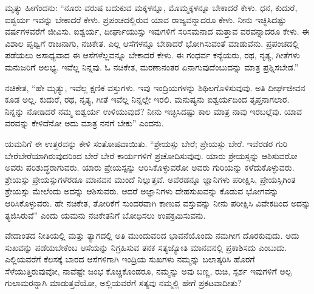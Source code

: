 \vskip 0.2cm 

ಮೃತ್ಯು ಹೀಗೆಂದನು: “ನೂರು ವರುಷ ಬದುಕುವ ಮಕ್ಕಳನ್ನೂ, ಮೊಮ್ಮಕ್ಕಳನ್ನೂ ಬೇಕಾದರೆ ಕೇಳು. ಧನ, ಕುದುರೆ, ಐಶ್ವರ್ಯ ಇವನ್ನು ಬೇಕಾದರೆ ಕೇಳು. ಪ್ರಪಂಚದಲ್ಲಿರುವ ಯಾವ ರಾಜ್ಯವನ್ನಾದರೂ ಕೇಳು. ನೀನು ಇಚ್ಛಿಸಿದಷ್ಟು ವರ್ಷಗಳವರೆಗೆ ಜೀವಿಸು. ಐಶ್ವರ್ಯ, ದೀರ್ಘಾಯುಸ್ಸು ಇವುಗಳಿಗೆ ಸರಿಸಮನಾದ ಮತ್ತಾವ ವರವನ್ನಾದರೂ ಕೇಳು. ಈ ವಿಶಾಲ ಪೃಥ್ವಿಗೆ ರಾಜನಾಗು, ನಚಿಕೇತ. ಎಲ್ಲ ಆಸೆಗಳನ್ನೂ ಬೇಕಾದರೆ ಭೋಗಿಸುವಂತೆ ಮಾಡುವೆನು. ಪ್ರಪಂಚದಲ್ಲಿ ಪಡೆಯಲು ಅಸಾಧ್ಯವಾದ ಈ ಆಸೆಗಳೆಲ್ಲವನ್ನೂ ಬೇಕಾದರೆ ಕೇಳು. ಈ ಗಂಧರ್ವ ಕನ್ಯೆಯರು, ರಥ, ನೃತ್ಯ, ಗೀತೆಗಳು ಮನುಜರಿಗೆ ಅಲಭ್ಯ. ಇವೆಲ್ಲ ನಿನ್ನವು. ಓ ನಚಿಕೇತ, ಮರಣಾನಂತರ ಏನಾಗುವುದೆಂಬುದನ್ನು ಮಾತ್ರ ಪ್ರಶ್ನಿಸಬೇಡ.”

\vskip 0.2cm 

ನಚಿಕೇತ, “ಹೇ ಮೃತ್ಯು, ಇವೆಲ್ಲ ಕ್ಷಣಿಕ ವಸ್ತುಗಳು. ಇವು ಇಂದ್ರಿಯಗಳನ್ನು ಶಿಥಿಲಗೊಳಿಸುವುವು. ಅತಿ ದೀರ್ಘಜೀವನ ಕೂಡ ಅಲ್ಲ. ಕುದುರೆ, ರಥ, ನೃತ್ಯ, ಗೀತೆ ಇವೆಲ್ಲ ನಿನ್ನಲ್ಲೇ ಇರಲಿ. ಮನುಷ್ಯನು ಐಶ್ವರ್ಯದಿಂದ ತೃಪ್ತನಾಗಲಾರ. ನಿನ್ನನ್ನು ನೋಡಿದರೆ ನಮ್ಮ ಐಶ್ವರ್ಯ ಉಳಿಯುವುದೆ? ನೀನು ಇಚ್ಛಿಸಿದಷ್ಟು ಕಾಲ ಮಾತ್ರ ನಾವು ಇರಬಲ್ಲೆವು. ಯಾವ ವರವನ್ನು ಕೇಳಿದೆನೋ ಅದು ಮಾತ್ರ ನನಗೆ ಬೇಕು” ಎಂದನು.

\vskip 0.2cm 

ಯಮನಿಗೆ ಈ ಉತ್ತರವನ್ನು ಕೇಳಿ ಸಂತೋಷವಾಯಿತು. “ಶ್ರೇಯಸ್ಸು ಬೇರೆ; ಪ್ರೇಯಸ್ಸು ಬೇರೆ. ಇವೆರಡರ ಗುರಿ ಬೇರೆಬೇರೆಯಾಗಿರುವುದರಿಂದ ಬೇರೆ ಬೇರೆ ಕಾರ್ಯಗಳಿಗೆ ಪ್ರಚೋದಿಸುವುವು. ಯಾರು ಶ್ರೇಯಸ್ಸನ್ನು ಆಶಿಸುವರೋ ಅವರು ಪರಿಶುದ್ಧರಾಗುವರು. ಯಾರು ಪ್ರೇಯಸ್ಸನ್ನು ಆರಿಸಿಕೊಳ್ಳುವರೋ ಅವರು ಗುರಿಯನ್ನು ಕಳೆದುಕೊಳ್ಳುವರು. ಶ್ರೇಯಸ್ಸು ಪ್ರೇಯಸ್ಸುಗಳೆರಡೂ ಮಾನವನ ಮುಂದೆ ನಿಲ್ಲುತ್ತವೆ. ಅವೆರಡನ್ನೂ ಜ್ಞಾನಿಗಳು ಪರೀಕ್ಷಿಸಿ, ಪ್ರೇಯಸ್ಸಿಗಿಂತ ಶ್ರೇಯಸ್ಸು ಮೇಲೆಂದು ಅದನ್ನು ಆಶಿಸುವರು. ಆದರೆ ಅಜ್ಞಾನಿಗಳು ದೇಹಸುಖವನ್ನು ಕೊಡುವ ಭೋಗವನ್ನು ಆರಿಸಿಕೊಳ್ಳುವರು. ಹೇ ನಚಿಕೇತ, ತೋರಿಕೆಗೆ ಸುಂದರವಾಗಿ ಕಾಣುವ ವಸ್ತುವನ್ನು ನೀನು ಪರೀಕ್ಷಿಸಿ ವಿವೇಕದಿಂದ ಅದನ್ನು ತ್ಯಜಿಸಿರುವೆ” ಎಂದು ಯಮನು ನಚಿಕೇತನಿಗೆ ಬೋಧಿಸಲು ಉಪಕ್ರಮಿಸುವನು.

\vskip 0.2cm 

ವೇದಾಂತದ ನೀತಿಯಲ್ಲಿ ಮತ್ತು ತ್ಯಾಗದಲ್ಲಿ ಅತಿ ಮುಂದುವರಿದ ಭಾವನೆಯೊಂದು ನಮಗೀಗ ದೊರಕುವುದು. ಅದು ಸುಖವನ್ನು ಪಡೆಯಬೇಕೆಂಬ ಆಸೆಯನ್ನು ನಿಗ್ರಹಿಸುವ ತನಕ ಸತ್ಯಜ್ಯೋತಿ ಮಾನವನಲ್ಲಿ ಪ್ರಕಾಶಿಸದು ಎಂಬುದು. ಎಲ್ಲಿಯವರೆಗೆ ಕೆಲಸಕ್ಕೆ ಬಾರದ ಆಸೆಗಳಿಗಾಗಿ ಇಂದ್ರಿಯ ಸುಖಗಳು ನಮ್ಮನ್ನು ಬಲಾತ್ಕರಿಸಿ ಹೊರಗೆ ಸೆಳೆಯುತ್ತಿರುವುವೋ, ನಾವೆಷ್ಟೇ ಜಂಭ ಕೊಚ್ಚಿಕೊಂಡರೂ, ನಮ್ಮನ್ನು ಅವು ಬಣ್ಣ, ರುಚಿ, ಸ್ಪರ್ಶ ಇವುಗಳಿಗೆ ಅಲ್ಪ ಗುಲಾಮರನ್ನಾಗಿ ಮಾಡುತ್ತವೆಯೋ, ಅಲ್ಲಿಯವರೆಗೆ ಸತ್ಯವು ನಮ್ಮಲ್ಲಿ ಹೇಗೆ ಪ್ರಕಟವಾದೀತು?

\vskip 0.2cm 

